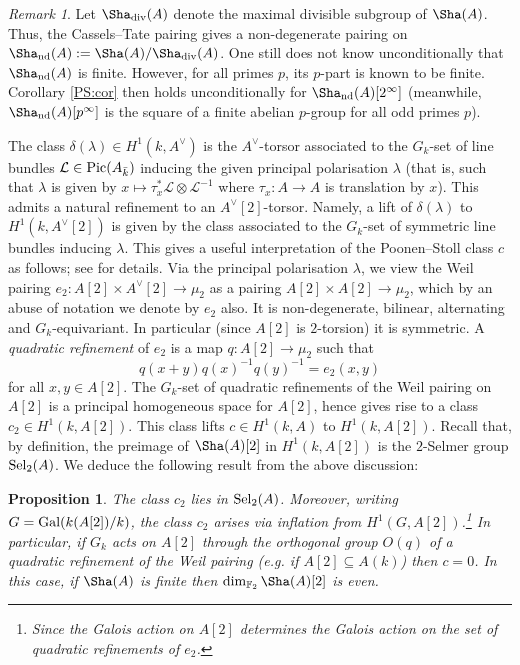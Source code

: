 \documentclass[10pt]{amsart}
\numberwithin{equation}{section}
\newtheorem{proposition}[equation]{Proposition}
\theoremstyle{remark}
\newtheorem{remark}[equation]{Remark}
\theoremstyle{definition}
\theoremstyle{definition}
\theoremstyle{definition}
\theoremstyle{definition}
\theoremstyle{definition}
\theoremstyle{definition}
\theoremstyle{definition}
\theoremstyle{definition}
\begin{document}
\begin{remark} \label{rmk_sha_div}
Let $\Sha_{\textup{div}}(A)$ denote the maximal divisible subgroup of $\Sha(A)$. Thus, the Cassels--Tate pairing gives a non-degenerate pairing on $\Sha_{\textup{nd}}(A):=\Sha(A)/\Sha_{\textup{div}}(A)$. One still does not know unconditionally that $\Sha_{\textup{nd}}(A)$ is finite. However, for all primes $p$, its $p$-part is known to be finite. Corollary  \ref{PS:cor} then holds unconditionally for $\Sha_{\textup{nd}}(A)[2^\infty]$ (meanwhile,  $\Sha_{\textup{nd}}(A)[p^\infty]$ is the square of a finite abelian $p$-group for all odd primes $p$).
\end{remark}


The class $\delta(\lambda)\in H^1(k,A^\vee)$ is the $A^\vee$-torsor associated to the $G_k$-set of line bundles $\mathcal{L}\in \textup{Pic}(A_{\bar{k}})$ inducing the given principal polarisation $\lambda$ (that is, such that $\lambda$ is given by $x\mapsto \tau^*_x\mathcal{L}\otimes \mathcal{L}^{-1}$ where $\tau_x:A\to A$ is translation by $x$). This admits a natural refinement to an $A^\vee[2]$-torsor. Namely, a lift of $\delta(\lambda)$ to $H^1(k,A^\vee[2])$ is given by the class associated to the $G_k$-set of symmetric line bundles inducing $\lambda$. This gives a useful interpretation of the Poonen--Stoll class $c$ as follows; see \cite[Section 3.4]{MR2915483} for details. Via the principal polarisation $\lambda$, we view the Weil pairing $e_2:A[2]\times A^\vee[2]\to \mu_2$ as a pairing $A[2]\times A[2]\to \mu_2$, which by an abuse of notation we denote by $e_2$ also. It is non-degenerate, bilinear, alternating and $G_k$-equivariant. In particular (since $A[2]$ is $2$-torsion) it is symmetric. A \textit{quadratic refinement} of $e_2$ is a map $q:A[2]\to \mu_2$ such that \[q(x+y)q(x)^{-1}q(y)^{-1}=e_2(x,y)\] for all $x,y\in A[2]$. The $G_k$-set of quadratic refinements of the Weil pairing on $A[2]$ is a principal homogeneous space for $A[2]$, hence gives rise to a class $c_2\in H^1(k,A[2])$. This class  lifts $c\in H^1(k,A)$ to $H^1(k,A[2])$. Recall that, by definition, the preimage of $\Sha(A)[2]$ in $H^1(k,A[2])$ is the $2$-Selmer group $\textup{Sel}_2(A)$. We deduce the following result from the above discussion:

\begin{proposition} \label{PS_quad_refinement_prop}
The class $c_2$ lies in $\textup{Sel}_2(A)$. Moreover, writing $G=\textup{Gal}(k(A[2])/k)$, the class $c_2$ arises via inflation from $H^1(G,A[2])$.\footnote{Since the Galois action on $A[2]$ determines the Galois action on the set of quadratic refinements of $e_2$.} In particular, if $G_k$ acts on $A[2]$ through the orthogonal group $O(q)$ of a quadratic refinement of the Weil pairing (e.g. if $A[2]\subseteq A(k)$) then $c=0$. In this case, if $\Sha(A)$ is finite then $\dim_{\mathbb{F}_2}\Sha(A)[2]$ is even.  
\end{proposition}  
\end{document}

